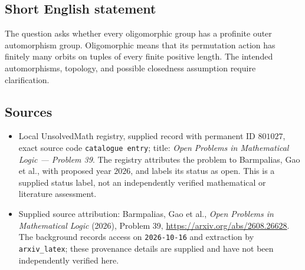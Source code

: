\documentclass[11pt]{article}
\begin{document}
\subsection{Short English statement}
The question asks whether every oligomorphic group has a profinite outer automorphism group. Oligomorphic means that its permutation action has finitely many orbits on tuples of every finite positive length. The intended automorphisms, topology, and possible closedness assumption require clarification.
\subsection{Sources}
\begin{itemize}
\item Local UnsolvedMath registry, supplied record with permanent ID \(801027\), exact source code \texttt{catalogue entry}; title: \emph{Open Problems in Mathematical Logic --- Problem 39}. The registry attributes the problem to Barmpalias, Gao et al., with proposed year \(2026\), and labels its status as open. This is a supplied status label, not an independently verified mathematical or literature assessment.
\item Supplied source attribution: Barmpalias, Gao et al., \emph{Open Problems in Mathematical Logic} (2026), Problem 39, \url{https://arxiv.org/abs/2608.26628}. The background records access on \texttt{2026-10-16} and extraction by \texttt{arxiv\_latex}; these provenance details are supplied and have not been independently verified here.
\end{itemize}
\end{document}
